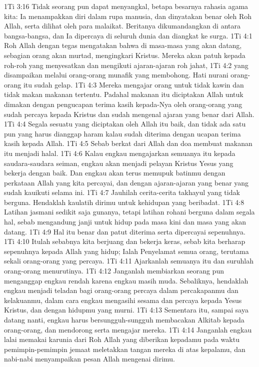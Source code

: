 1Ti 3:16  Tidak seorang pun dapat menyangkal, betapa besarnya rahasia agama kita: Ia menampakkan diri dalam rupa manusia, dan dinyatakan benar oleh Roh Allah, serta dilihat oleh para malaikat. Beritanya dikumandangkan di antara bangsa-bangsa, dan Ia dipercaya di seluruh dunia dan diangkat ke surga.
1Ti 4:1  Roh Allah dengan tegas mengatakan bahwa di masa-masa yang akan datang, sebagian orang akan murtad, mengingkari Kristus. Mereka akan patuh kepada roh-roh yang menyesatkan dan mengikuti ajaran-ajaran roh jahat,
1Ti 4:2  yang disampaikan melalui orang-orang munafik yang membohong. Hati nurani orang-orang itu sudah gelap.
1Ti 4:3  Mereka mengajar orang untuk tidak kawin dan tidak makan makanan tertentu. Padahal makanan itu diciptakan Allah untuk dimakan dengan pengucapan terima kasih kepada-Nya oleh orang-orang yang sudah percaya kepada Kristus dan sudah mengenal ajaran yang benar dari Allah.
1Ti 4:4  Segala sesuatu yang diciptakan oleh Allah itu baik, dan tidak ada satu pun yang harus dianggap haram kalau sudah diterima dengan ucapan terima kasih kepada Allah.
1Ti 4:5  Sebab berkat dari Allah dan doa membuat makanan itu menjadi halal.
1Ti 4:6  Kalau engkau mengajarkan semuanya itu kepada saudara-saudara seiman, engkau akan menjadi pelayan Kristus Yesus yang bekerja dengan baik. Dan engkau akan terus memupuk batinmu dengan perkataan Allah yang kita percayai, dan dengan ajaran-ajaran yang benar yang sudah kauikuti selama ini.
1Ti 4:7  Jauhilah cerita-cerita takhayul yang tidak berguna. Hendaklah kaulatih dirimu untuk kehidupan yang beribadat.
1Ti 4:8  Latihan jasmani sedikit saja gunanya, tetapi latihan rohani berguna dalam segala hal, sebab mengandung janji untuk hidup pada masa kini dan masa yang akan datang.
1Ti 4:9  Hal itu benar dan patut diterima serta dipercayai sepenuhnya.
1Ti 4:10  Itulah sebabnya kita berjuang dan bekerja keras, sebab kita berharap sepenuhnya kepada Allah yang hidup; Ialah Penyelamat semua orang, terutama sekali orang-orang yang percaya.
1Ti 4:11  Ajarkanlah semuanya itu dan suruhlah orang-orang menurutinya.
1Ti 4:12  Janganlah membiarkan seorang pun menganggap engkau rendah karena engkau masih muda. Sebaliknya, hendaklah engkau menjadi teladan bagi orang-orang percaya dalam percakapanmu dan kelakuanmu, dalam cara engkau mengasihi sesama dan percaya kepada Yesus Kristus, dan dengan hidupmu yang murni.
1Ti 4:13  Sementara itu, sampai saya datang nanti, engkau harus bersungguh-sungguh membacakan Alkitab kepada orang-orang, dan mendorong serta mengajar mereka.
1Ti 4:14  Janganlah engkau lalai memakai karunia dari Roh Allah yang diberikan kepadamu pada waktu pemimpin-pemimpin jemaat meletakkan tangan mereka di atas kepalamu, dan nabi-nabi menyampaikan pesan Allah mengenai dirimu.
